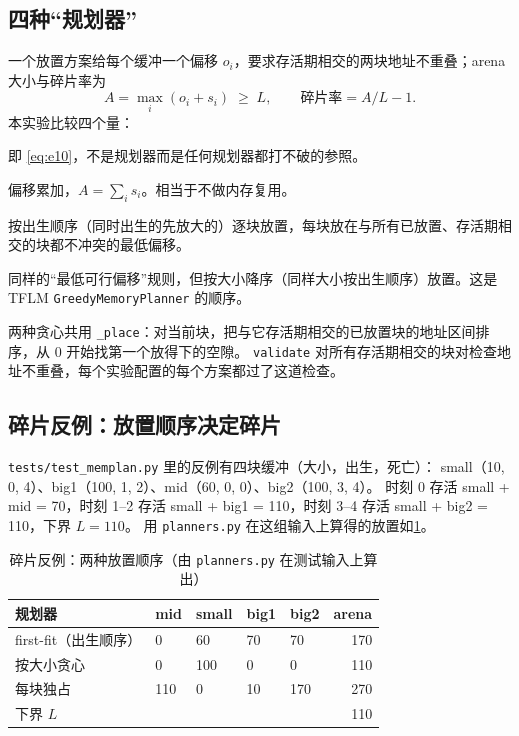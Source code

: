 \documentclass[11pt,a4paper]{ctexart}
\begin{document}
\subsection{四种“规划器”}
一个放置方案给每个缓冲一个偏移 $o_i$，要求存活期相交的两块地址不重叠；arena 大小与碎片率为
\begin{equation}
  A = \max_i (o_i + s_i) \;\ge\; L, \qquad \text{碎片率} = A / L - 1 . \label{eq:e11}
\end{equation}
本实验比较四个量：
\begin{description}[leftmargin=1.5em]
  \item[下界 \texttt{lower\_bound}] 即 \cref{eq:e10}，不是规划器而是任何规划器都打不破的参照。
  \item[每块独占 \texttt{naive}] 偏移累加，$A=\sum_i s_i$。相当于不做内存复用。
  \item[first-fit] 按出生顺序（同时出生的先放大的）逐块放置，每块放在与所有已放置、存活期相交的块都不冲突的最低偏移。
  \item[按大小贪心 \texttt{greedy\_by\_size}] 同样的“最低可行偏移”规则，但按大小降序（同样大小按出生顺序）放置。这是 TFLM \texttt{GreedyMemoryPlanner} 的顺序。
\end{description}
两种贪心共用 \texttt{\_place}：对当前块，把与它存活期相交的已放置块的地址区间排序，从 0 开始找第一个放得下的空隙。
\texttt{validate} 对所有存活期相交的块对检查地址不重叠，每个实验配置的每个方案都过了这道检查。

\subsection{碎片反例：放置顺序决定碎片}
\texttt{tests/test\_memplan.py} 里的反例有四块缓冲（大小，出生，死亡）：
small（10, 0, 4）、big1（100, 1, 2）、mid（60, 0, 0）、big2（100, 3, 4）。
时刻 0 存活 small + mid = 70，时刻 1--2 存活 small + big1 = 110，时刻 3--4 存活 small + big2 = 110，下界 $L=110$。
用 \texttt{planners.py} 在这组输入上算得的放置如\cref{tab:frag}。

\begin{table}[H]
\centering\small
\caption{碎片反例：两种放置顺序（由 \texttt{planners.py} 在测试输入上算出）}\label{tab:frag}
\begin{tabular}{lllllr}
\toprule
规划器 & mid & small & big1 & big2 & arena \\
\midrule
first-fit（出生顺序） & 0 & 60 & 70 & 70 & 170 \\
按大小贪心 & 0 & 100 & 0 & 0 & 110 \\
每块独占 & 110 & 0 & 10 & 170 & 270 \\
\midrule
下界 $L$ & \multicolumn{4}{l}{} & 110 \\
\bottomrule
\end{tabular}
\end{table}
\end{document}
